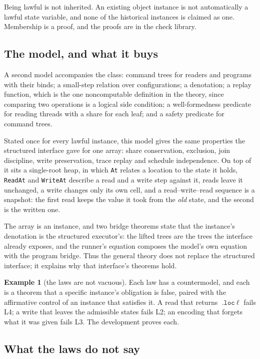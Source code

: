\documentclass[11pt,a4paper]{article}
\theoremstyle{definition}
\newtheorem{example}[definition]{Example}
\theoremstyle{plain}
\newcommand{\code}[1]{\texttt{#1}}
\begin{document}
Being lawful is not inherited. An existing object instance is not automatically
a lawful state variable, and none of the historical instances is claimed as one.
Membership is a proof, and the proofs are in the check library.

\subsection{The model, and what it buys}

A second model accompanies the class: command trees for readers and programs
with their binds; a small-step relation over configurations; a denotation; a
replay function, which is the one noncomputable definition in the theory, since
comparing two operations is a logical side condition; a well-formedness
predicate for reading threads with a share for each leaf; and a safety predicate
for command trees.

Stated once for every lawful instance, this model gives the same properties the
structured interface gave for one array: share conservation, exclusion, join
discipline, write preservation, trace replay and schedule independence. On top
of it sits a single-root heap, in which \code{At} relates a location to the
state it holds, \code{ReadAt} and \code{WriteAt} describe a read and a write step
against it, reads leave it unchanged, a write changes only its own cell, and a
read--write--read sequence is a snapshot: the first read keeps the value it took
from the \emph{old} state, and the second is the written one.

The array is an instance, and two bridge theorems state that the instance's
denotation is the structured executor's: the lifted trees are the trees the
interface already exposes, and the runner's equation composes the model's own
equation with the program bridge. Thus the general theory does not replace the
structured interface; it explains why that interface's theorems hold.

\begin{example}[the laws are not vacuous]\label{ex:nonvacuous}
Each law has a countermodel, and each is a theorem that a specific instance's
obligation is false, paired with the affirmative control of an instance that
satisfies it. A read that returns $\code{.loc}\ \ell$ fails L4; a write that
leaves the admissible states fails L2; an encoding that forgets what it was
given fails L3. The development proves each.
\end{example}

\subsection{What the laws do not say}
\end{document}
